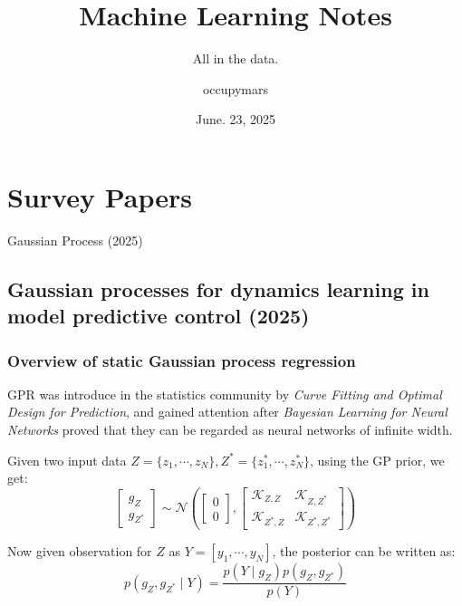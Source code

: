 \documentclass[10pt]{elegantbook}
\title{Machine Learning Notes}
\subtitle{All in the data.}
\author{occupymars}
\date{June. 23, 2025}
\begin{document}
\maketitle

\frontmatter
\tableofcontents

\mainmatter

\chapter{Survey Papers}

\begin{introduction}
    \item Gaussian Process (2025)
\end{introduction}

\section{Gaussian processes for dynamics learning in model predictive control (2025)}

\subsection{Overview of static Gaussian process regression}

GPR was introduce in the statistics community by \textit{Curve Fitting and Optimal Design for Prediction}, and gained
attention after \textit{Bayesian Learning for Neural Networks} proved that they can be regarded as neural networks of infinite
width.

Given two input data $Z = \{ z_1, \cdots, z_N \}, Z^* = \{ z^*_1, \cdots, z^*_N \}$, using the GP prior, we get:
\[
\begin{bmatrix}
    g_Z \\ g_{Z^*}
\end{bmatrix} \sim \mathcal N 
\left (
\begin{bmatrix}
    0 \\ 0
\end{bmatrix},
\begin{bmatrix}
    \mathscr{K}_{Z, Z} & \mathscr{K}_{Z, Z^*} \\
    \mathscr{K}_{Z^*, Z} & \mathscr{K}_{Z^*, Z^*}
\end{bmatrix}    
\right )
\]

Now given observation for $Z$ as $Y = [y_1, \cdots, y_N]$, the posterior can be written as:
\[
p(g_Z, g_{Z^*} \mid Y) = \frac{p(Y \mid g_Z)p(g_Z, g_{Z^*})}{p(Y)}
\]
\end{document}
